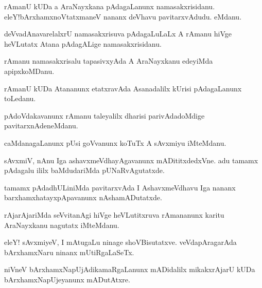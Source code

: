 \documentclass{article}
\begin{document}
\begin{mn}%
rAmanU kUDa a AraNayxkana pAdagaLanunx namasakxrisidanu. eleY!bArxhamxnoVtatxmaneV nananx 
deVhavu pavitarxvAdudu. eMdanu.
\end{mn}

\begin{mn}%
deVvadAnavarelalxrU namasakxrisuva pAdagaLuLaLx A rAmanu hiVge heVLutatx Atana pAdagALige 
namasakxrisidanu.
\end{mn}

\begin{mn}%
rAmanu namasakxrisalu tapasivxyAda A AraNayxkanu edeyiMda apipxkoMDanu.
\end{mn}

\begin{mn}%
rAmanU kUDa Atananunx etatxravAda Asanadalilx kUrisi pAdagaLanunx toLedanu. 
\end{mn}

\begin{mn}%
pAdoVdakavanunx rAmanu taleyalilx dharisi parivAdadoMdige pavitarxnAdeneMdanu. 
\end{mn}

\begin{mn}%
caMdanagaLanunx pUsi goVvanunx koTuTx A sAvxmiyu iMteMdanu.
\end{mn}

\begin{mn}%
sAvxmiV, nAnu Iga ashavxmeVdhayAgavanunx mADititxdedxVne.  adu tamamx pAdagalu ililx 
baMdudariMda pUNaRvAgutatxde.
\end{mn}

\begin{mn}%
tamamx pAdadhULiniMda pavitarxvAda I AshavxmeVdhavu Iga nananx barxhamxhatayxpApavanunx 
nAshamADutatxde.
\end{mn}

\begin{mn}%
rAjarAjariMda seVvitanAgi hiVge heVLutitxruva rAmananunx karitu AraNayxkanu nagutatx 
iMteMdanu.
\end{mn}

\begin{mn}%
eleY! sAvxmiyeV, I mAtugaLu ninage shoVBisutatxve. veVdapAragarAda bArxhamxNaru ninanx 
mUtiRgaLaSeTx.
\end{mn}

\begin{mn}%
niVneV bArxhamxNapUjAdikamaRgaLanunx mADidalilx mikakxrAjarU kUDa bArxhamxNapUjeyanunx 
mADutAtxre.
\end{mn}
\end{document}
